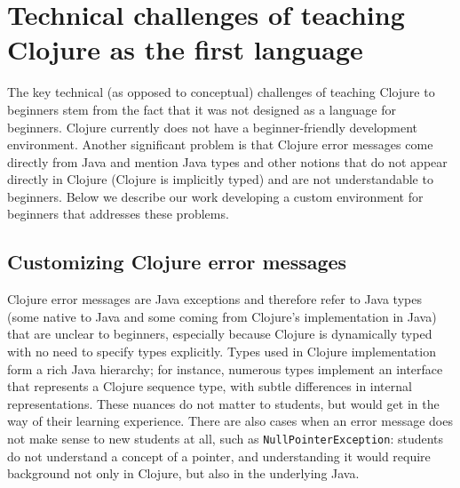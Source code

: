 \documentclass[submission,copyright,creativecommons]{eptcs}
\newcommand{\allcomments}[1]{{#1}}
\newcommand{\elenacomment}[1]{{\bf \textcolor{ForestGreen}{\allcomments{{#1}}}}}
\newcommand{\stephencomment}[1]{{\bf \color{StephensBlue}{\allcomments{{#1}}}}} %
\newcommand{\joecomment}[1]{{\bf \color{JoesGold}{\allcomments{{#1}}}}}
\newcommand{\todo}[1]{{\bf \color{magenta}{\allcomments{ To-do: {#1}}}}}
\begin{document}

\section{Technical challenges of teaching Clojure as the first language}\label{sec:technical}
The key technical (as opposed to conceptual) challenges of teaching Clojure to beginners stem from the fact that it was not designed as a language for beginners. Clojure currently does not have a beginner-friendly development environment. Another significant problem is that Clojure error messages come directly from Java and mention Java types and other notions %
that do not appear directly in Clojure (Clojure is implicitly typed) and are not understandable to beginners. 
Below we describe our work developing a custom environment for beginners that addresses these problems.

\subsection{Customizing Clojure error messages}\label{subsec:errors}

Clojure error messages are Java exceptions and therefore refer to Java types (some native to Java and some coming from Clojure's implementation in Java) that are unclear to beginners, especially because Clojure is dynamically typed with no need  to specify types explicitly. 
Types used in Clojure implementation form a rich Java hierarchy; for instance, numerous types implement an interface that represents a Clojure sequence type, with subtle differences in internal representations.   
These nuances do not matter to students, but would get in the way of their learning experience. There are also cases when an error message does not make sense to new students at all, such as {\tt NullPointerException}: students do not understand a concept of a pointer, and understanding it would require background  not only in Clojure, but also in the underlying Java. 
\end{document}
